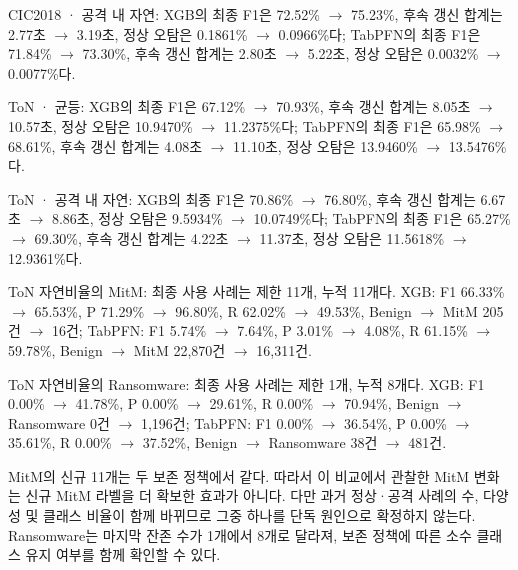 CIC2018 · 공격 내 자연: XGB의 최종 F1은 72.52\% \ensuremath{\rightarrow} 75.23\%, 후속 갱신 합계는 2.77초 \ensuremath{\rightarrow} 3.19초, 정상 오탐은 0.1861\% \ensuremath{\rightarrow} 0.0966\%다; TabPFN의 최종 F1은 71.84\% \ensuremath{\rightarrow} 73.30\%, 후속 갱신 합계는 2.80초 \ensuremath{\rightarrow} 5.22초, 정상 오탐은 0.0032\% \ensuremath{\rightarrow} 0.0077\%다.

ToN · 균등: XGB의 최종 F1은 67.12\% \ensuremath{\rightarrow} 70.93\%, 후속 갱신 합계는 8.05초 \ensuremath{\rightarrow} 10.57초, 정상 오탐은 10.9470\% \ensuremath{\rightarrow} 11.2375\%다; TabPFN의 최종 F1은 65.98\% \ensuremath{\rightarrow} 68.61\%, 후속 갱신 합계는 4.08초 \ensuremath{\rightarrow} 11.10초, 정상 오탐은 13.9460\% \ensuremath{\rightarrow} 13.5476\%다.

ToN · 공격 내 자연: XGB의 최종 F1은 70.86\% \ensuremath{\rightarrow} 76.80\%, 후속 갱신 합계는 6.67초 \ensuremath{\rightarrow} 8.86초, 정상 오탐은 9.5934\% \ensuremath{\rightarrow} 10.0749\%다; TabPFN의 최종 F1은 65.27\% \ensuremath{\rightarrow} 69.30\%, 후속 갱신 합계는 4.22초 \ensuremath{\rightarrow} 11.37초, 정상 오탐은 11.5618\% \ensuremath{\rightarrow} 12.9361\%다.

ToN 자연비율의 MitM: 최종 사용 사례는 제한 11개, 누적 11개다. XGB: F1 66.33\% \ensuremath{\rightarrow} 65.53\%, P 71.29\% \ensuremath{\rightarrow} 96.80\%, R 62.02\% \ensuremath{\rightarrow} 49.53\%, Benign \ensuremath{\rightarrow} MitM 205건 \ensuremath{\rightarrow} 16건; TabPFN: F1 5.74\% \ensuremath{\rightarrow} 7.64\%, P 3.01\% \ensuremath{\rightarrow} 4.08\%, R 61.15\% \ensuremath{\rightarrow} 59.78\%, Benign \ensuremath{\rightarrow} MitM 22,870건 \ensuremath{\rightarrow} 16,311건.

ToN 자연비율의 Ransomware: 최종 사용 사례는 제한 1개, 누적 8개다. XGB: F1 0.00\% \ensuremath{\rightarrow} 41.78\%, P 0.00\% \ensuremath{\rightarrow} 29.61\%, R 0.00\% \ensuremath{\rightarrow} 70.94\%, Benign \ensuremath{\rightarrow} Ransomware 0건 \ensuremath{\rightarrow} 1,196건; TabPFN: F1 0.00\% \ensuremath{\rightarrow} 36.54\%, P 0.00\% \ensuremath{\rightarrow} 35.61\%, R 0.00\% \ensuremath{\rightarrow} 37.52\%, Benign \ensuremath{\rightarrow} Ransomware 38건 \ensuremath{\rightarrow} 481건.

MitM의 신규 11개는 두 보존 정책에서 같다. 따라서 이 비교에서 관찰한 MitM 변화는 신규 MitM 라벨을 더 확보한 효과가 아니다. 다만 과거 정상·공격 사례의 수, 다양성 및 클래스 비율이 함께 바뀌므로 그중 하나를 단독 원인으로 확정하지 않는다. Ransomware는 마지막 잔존 수가 1개에서 8개로 달라져, 보존 정책에 따른 소수 클래스 유지 여부를 함께 확인할 수 있다.

